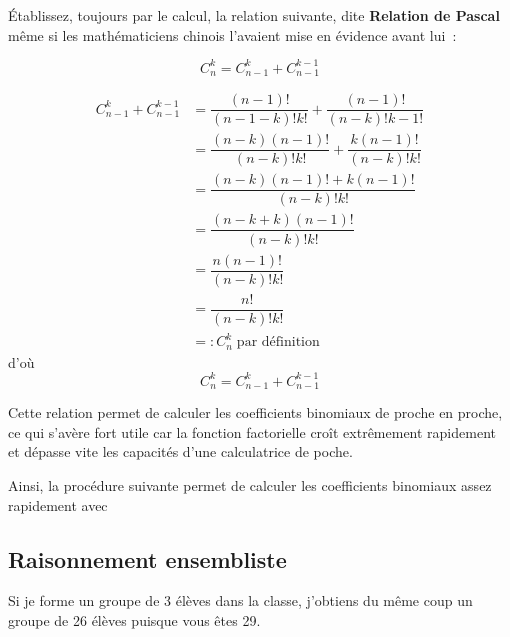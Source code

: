 \documentclass[french]{book}
\newcommand{\co}[2]{C_#2^#1}
\begin{document}
\'Etablissez, toujours par le calcul, la relation suivante, dite \textbf{Relation de Pascal} même si les mathématiciens chinois l'avaient
mise en évidence avant lui~:


\begin{prop}
   $$\co{k}{n}=\co{{k}}{{n-1}}+\co{{k-1}}{{n-1}}$$
\end{prop}

\begin{demo}
\begin{align*}
\co{{k}}{{n-1}}+\co{{k-1}}{{n-1}} &=\dfrac{(n-1)!}{(n-1-k)!k!}+\dfrac{(n-1)!}{(n-k)!k-1!}\\
& = \dfrac{(n-k)(n-1)!}{(n-k)!k!}+\dfrac{k(n-1)!}{(n-k)!k!} \\
& = \dfrac{(n-k)(n-1)! + k(n-1)!}{(n-k)!k!} \\
& = \dfrac{(n-k + k)(n-1)!}{(n-k)!k!} \\
& =\dfrac{n(n-1)!}{(n-k)!k!} \\
& =\dfrac{n!}{(n-k)!k!}\\
 & =:\co{k}{n} \; \text{par définition}
\end{align*}
d'où 
$$\co{k}{n}=\co{{k}}{{n-1}}+\co{{k-1}}{{n-1}}$$

\end{demo}



Cette relation permet de calculer les coefficients binomiaux de proche en proche, ce qui s'avère fort utile car la fonction factorielle
croît extrêmement rapidement et dépasse vite les capacités d'une calculatrice de poche.

Ainsi, la procédure suivante permet de calculer les coefficients binomiaux assez rapidement avec




\newpage
\subsection{Raisonnement ensembliste}

Si je forme un groupe de 3 élèves dans la classe, j'obtiens du même coup un groupe de 26 élèves puisque vous êtes 29.
\end{document}
